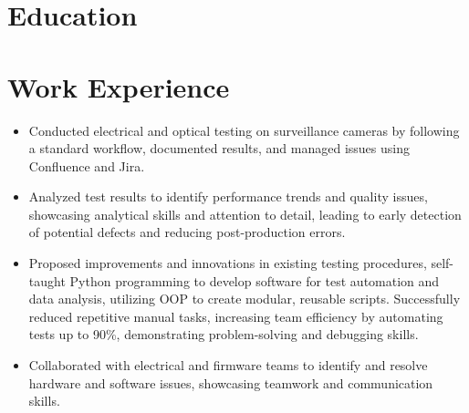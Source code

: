 \documentclass[11pt,a4paper,sans]{moderncv}
\begin{document}
\makecvtitle
\vspace{-1.5cm} 

\section{Education}

\vspace{-0.5cm} 

\section{Work Experience}
{
    \begin{itemize}
    \item Conducted electrical and optical testing on surveillance cameras by following a standard workflow, documented results, and managed issues using Confluence and Jira.
    \item Analyzed test results to identify performance trends and quality issues, showcasing analytical skills and attention to detail, leading to early detection of potential defects and reducing post-production errors.
    \item Proposed improvements and innovations in existing testing procedures, self-taught Python programming to develop software for test automation and data analysis, utilizing OOP to create modular, reusable scripts. Successfully reduced repetitive manual tasks, increasing team efficiency by automating tests up to 90\%, demonstrating problem-solving and debugging skills.
    \item Collaborated with electrical and firmware teams to identify and resolve hardware and software issues, showcasing teamwork and communication skills.
    \end{itemize}
}
\end{document}
